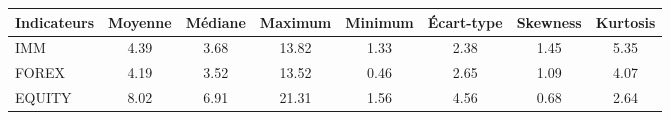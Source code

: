 \begin{tabular}{lccccccc}
        \toprule
        \textbf{Indicateurs} & \textbf{Moyenne} & \textbf{Médiane} & \textbf{Maximum} & \textbf{Minimum} & \textbf{Écart-type} & \textbf{Skewness} & \textbf{Kurtosis} \\
        \midrule
        IMM      & 4.39  & 3.68  & 13.82  & 1.33  & 2.38  & 1.45  & 5.35  \\
        FOREX    & 4.19  & 3.52  & 13.52  & 0.46  & 2.65  & 1.09  & 4.07  \\
        EQUITY   & 8.02  & 6.91  & 21.31  & 1.56  & 4.56  & 0.68  & 2.64  \\
        \bottomrule
\end{tabular}
